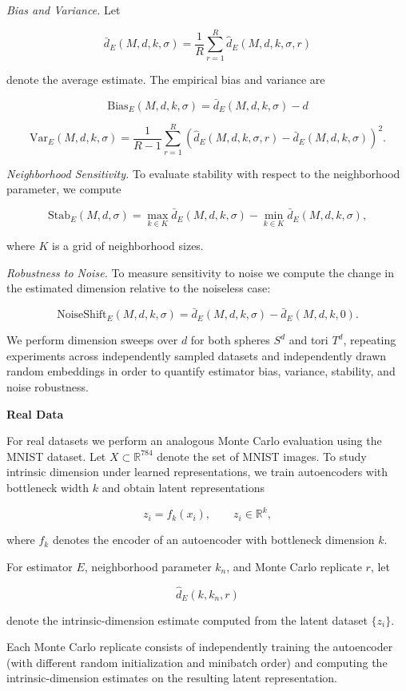 \documentclass[11pt]{article}
\begin{document}
\emph{Bias and Variance.}  
Let

\[
\bar d_E(M,d,k,\sigma)
=
\frac{1}{R}
\sum_{r=1}^{R}
\hat d_{E}(M,d,k,\sigma,r)
\]

denote the average estimate. 
The empirical bias and variance are

\[
\mathrm{Bias}_E(M,d,k,\sigma)
=
\bar d_E(M,d,k,\sigma)-d
\]

\[
\mathrm{Var}_E(M,d,k,\sigma)
=
\frac{1}{R-1}
\sum_{r=1}^{R}
\left(
\hat d_{E}(M,d,k,\sigma,r)
-
\bar d_E(M,d,k,\sigma)
\right)^2 .
\]

\emph{Neighborhood Sensitivity.}  
To evaluate stability with respect to the neighborhood parameter, we compute

\[
\mathrm{Stab}_E(M,d,\sigma)
=
\max_{k \in K}
\bar d_E(M,d,k,\sigma)
-
\min_{k \in K}
\bar d_E(M,d,k,\sigma),
\]

where $K$ is a grid of neighborhood sizes.

\emph{Robustness to Noise.}  
To measure sensitivity to noise we compute the change in the estimated dimension relative to the noiseless case:

\[
\mathrm{NoiseShift}_E(M,d,k,\sigma)
=
\bar d_E(M,d,k,\sigma)
-
\bar d_E(M,d,k,0).
\]

We perform dimension sweeps over $d$ for both spheres $S^d$ and tori $T^d$, repeating experiments across independently sampled datasets and independently drawn random embeddings in order to quantify estimator bias, variance, stability, and noise robustness.

\textbf{Real Data}

For real datasets we perform an analogous Monte Carlo evaluation using the MNIST dataset. 
Let $X \subset \mathbb{R}^{784}$ denote the set of MNIST images. 
To study intrinsic dimension under learned representations, we train autoencoders with bottleneck width $k$ and obtain latent representations

\[
z_i = f_k(x_i), \qquad z_i \in \mathbb{R}^k,
\]

where $f_k$ denotes the encoder of an autoencoder with bottleneck dimension $k$.

For estimator $E$, neighborhood parameter $k_n$, and Monte Carlo replicate $r$, let

\[
\hat d_E(k,k_n,r)
\]

denote the intrinsic-dimension estimate computed from the latent dataset $\{z_i\}$.

Each Monte Carlo replicate consists of independently training the autoencoder (with different random initialization and minibatch order) and computing the intrinsic-dimension estimates on the resulting latent representation.
\end{document}
